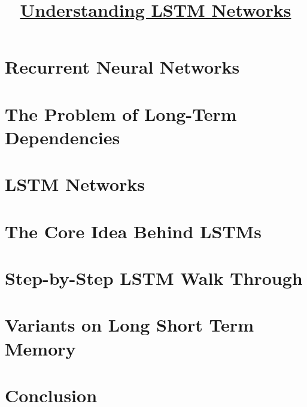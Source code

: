 \documentclass[en,hazy,blue,10pt,normal]{elegantnote}
\title{\href{https://colah.github.io/posts/2015-08-Understanding-LSTMs/}{Understanding LSTM Networks}}
\begin{document}
\maketitle

\section{Recurrent Neural Networks}


\section{The Problem of Long-Term Dependencies}


\section{LSTM Networks}


\section{The Core Idea Behind LSTMs}


\section{Step-by-Step LSTM Walk Through}


\section{Variants on Long Short Term Memory}


\section{Conclusion}

\end{document}
